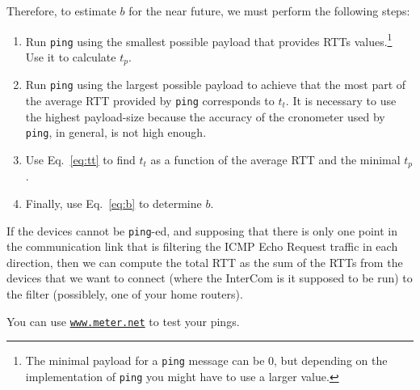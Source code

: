 Therefore, to estimate $b$ for the near future, we must perform the
following steps:

\begin{enumerate}
  
\item Run \texttt{ping} using the smallest possible payload that
  provides RTTs values.\footnote{The minimal payload for a
    \texttt{ping} message can be 0, but depending on the
    implementation of \texttt{ping} you might have to use a larger
    value.} Use it to calculate $t_p$.
  
\item Run \texttt{ping} using the largest possible payload to achieve
  that the most part of the average RTT provided by \texttt{ping}
  corresponds to $t_t$. It is necessary to use the highest
  payload-size because the accuracy of the cronometer used by
  \texttt{ping}, in general, is not high enough.
  
\item Use Eq.~\eqref{eq:tt} to find $t_t$ as a function of the average
  RTT and the minimal $t_p$.
  
\item Finally, use Eq.~\eqref{eq:b} to determine $b$.
  
\end{enumerate}

If the devices cannot be \texttt{ping}-ed, and supposing that there is
only one point in the communication link that is filtering the ICMP
Echo Request traffic in each direction, then we can compute the total RTT as
the sum of the RTTs from the devices that we want to connect (where
the InterCom is it supposed to be run) to the filter (possiblely, one
of your home routers).

You can use \href{https://www.meter.net/}{\texttt{www.meter.net}} to test your pings.


